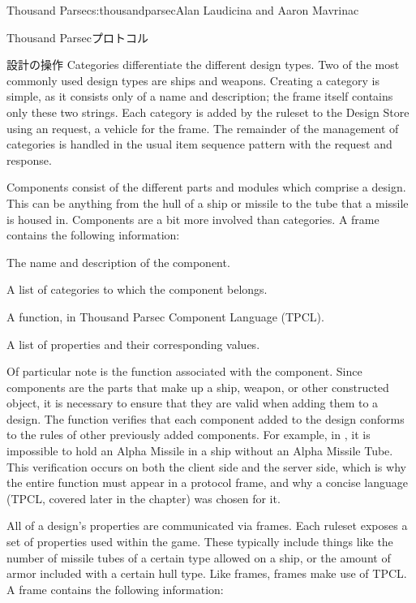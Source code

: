 \begin{aosachapter}{Thousand Parsec}{s:thousandparsec}{Alan Laudicina and Aaron Mavrinac}
\begin{aosasect1}{Thousand Parsecプロトコル}
\begin{aosasect2}{設計の操作}
Categories differentiate the different design types. Two of the most
commonly used design types are ships and weapons. Creating a category
is simple, as it consists only of a name and description; the
 frame itself contains only these two strings. Each
category is added by the ruleset to the Design Store using an
 request, a vehicle for the 
frame. The remainder of the management of categories is handled in the
usual item sequence pattern with the  request
and  response.

Components consist of the different parts and modules which comprise a
design. This can be anything from the hull of a ship or missile to the
tube that a missile is housed in. Components are a bit more involved
than categories. A  frame contains the following
information:

\begin{aosaitemize}

  \item The name and description of the component.

  \item A list of categories to which the component belongs.

  \item A  function, in Thousand Parsec Component
  Language (TPCL).

  \item A list of properties and their corresponding values.

\end{aosaitemize}

Of particular note is the  function associated with
the component. Since components are the parts that make up a ship,
weapon, or other constructed object, it is necessary to ensure that
they are valid when adding them to a design. The 
function verifies that each component added to the design conforms to
the rules of other previously added components. For example, in
, it is impossible to hold an Alpha
Missile in a ship without an Alpha Missile Tube. This verification
occurs on both the client side and the server side, which is why the
entire function must appear in a protocol frame, and why a concise
language (TPCL, covered later in the chapter) was chosen for it.

All of a design's properties are communicated via 
frames. Each ruleset exposes a set of properties used within the
game. These typically include things like the number of missile tubes
of a certain type allowed on a ship, or the amount of armor included
with a certain hull type. Like  frames,
 frames make use of TPCL\@. A  frame
contains the following information:


\end{aosasect2}
\end{aosasect1}
\end{aosachapter}
